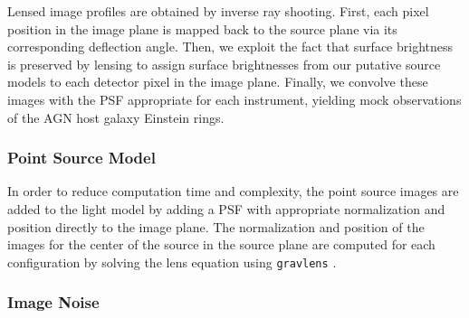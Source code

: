 \documentclass[a4paper,11pt]{article}
\begin{document}
{Lensed image profiles are obtained by inverse ray shooting. First,
each pixel position in the image plane is mapped back to the source
plane via its corresponding deflection angle. Then, we exploit
the fact that surface brightness is preserved by lensing to assign
surface brightnesses from our putative source models to each detector pixel in the image plane.
Finally, we convolve these images with the PSF appropriate for each instrument, yielding
mock observations of the AGN host galaxy Einstein rings.


\subsubsection{Point Source Model}

In order to reduce computation time and complexity, the point source
images are added to the light model by adding a PSF with appropriate
normalization and position directly to the image plane. The
normalization and position of the images for the center of the source
in the source plane are computed for each configuration by solving the
lens equation using \texttt{gravlens} \cite{2011ascl.soft02003K}.


%


\subsubsection{Image Noise}

}
\end{document}
